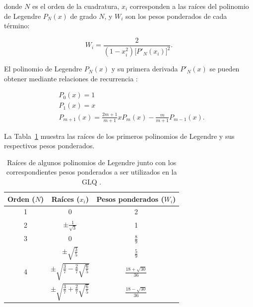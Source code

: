 \noindent donde $N$ es el orden de la cuadratura,
$x_i$ corresponden a las raíces del polinomio de Legendre $P_N(x)$ de grado
$N$, y $W_i$ son los pesos ponderados de cada término:

\begin{equation}
    W_i = \frac{2}{(1 - x_i^2) \Big[ P'_N(x_i) \Big]^2}.
\end{equation}

\noindent El polinomio de Legendre $P_N(x)$ y su primera derivada $P'_N(x)$ se
pueden obtener mediante relaciones de recurrencia \citep[][p.~330]{hildebrand1987}:

\begin{align}
    &P_0(x) = 1 \\
    &P_1(x) = x \\
    &P_{m + 1}(x) = \frac{2m + 1}{m + 1} x P_m(x) - \frac{m}{m + 1}P_{m-1}(x).
\end{align}

La Tabla~\ref{tab:legendre-roots} muestra las raíces de los primeros polinomios
de Legendre y sus respectivos pesos ponderados.

\begin{table}
    \centering
    \caption{
        Raíces de algunos polinomios de Legendre junto con los correspondientes
        pesos ponderados a ser utilizados en la \ac{GLQ}
        \citep[][p.~392]{hildebrand1987}.
    }
    \begin{tabular}{ccc}
        \hline
        Orden ($N$) & Raíces ($x_i$)                                     & Pesos ponderados ($W_i$)    \\
        \hline
        1     & 0                                                        & 2                           \\
        2     & $\pm \frac{1}{\sqrt{3}}$                                 & 1                           \\
        3     & 0                                                        & $\frac{8}{9}$               \\
              & $\pm \sqrt{\frac{3}{5}}$                                 & $\frac{5}{9}$               \\
        4     & $\pm \sqrt{\frac{3}{7} - \frac{2}{7}\sqrt{\frac{6}{5}}}$ & $\frac{18 + \sqrt{30}}{36}$ \\
              & $\pm \sqrt{\frac{3}{7} + \frac{2}{7}\sqrt{\frac{6}{5}}}$ & $\frac{18 - \sqrt{30}}{36}$
    \end{tabular}
    \label{tab:legendre-roots}
\end{table}

